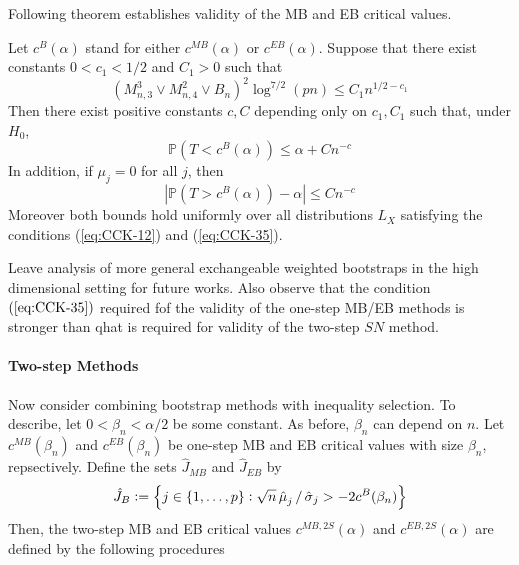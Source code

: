 Following theorem establishes validity of the MB and EB critical values. 
\vbox{ }
\begin{theorem}
	\label{thm:CCK-4.3}
	Let $c^B(\alpha)$ stand for either $c^{MB}(\alpha)$ or $c^{EB}(\alpha)$. Suppose that there exist constants $0 < c_1 < 1/2$ and $C_1 > 0$ such that 
	\begin{equation}
		\label{eq:CCK-35}
		(M_{n,3}^3 \vee M_{n,4}^2 \vee B_n)^2 \log^{7/2}(pn) \leq C_1 n^{1/2 - c_1}
	\end{equation}
	Then there exist positive constants $c, C$ depending only on $c_1, C_1$ such that, under $H_0$,
	\begin{equation}
		\label{eq:CCK-36}
		\mathbb{P}(T < c^B(\alpha))\leq \alpha + Cn^{-c}
	\end{equation}
	In addition, if $\mu_j = 0$ for all $j$, then 
	\begin{equation}
		\label{eq:CCK-37}
		\left|\mathbb{P}(T > c^B(\alpha)) - \alpha \right| \leq Cn^{-c}
	\end{equation}
	Moreover both bounds hold uniformly over all distributions $L_X$ satisfying the conditions (\ref{eq:CCK-12}) and (\ref{eq:CCK-35}).
\end{theorem}

Leave analysis of more general exchangeable weighted bootstraps in the high dimensional setting for future works. Also observe that the condition $(\ref{eq:CCK-35})$ required fof the validity of the one-step MB/EB methods is stronger than qhat is required for validity of the two-step $SN$ method.

\paragraph{Two-step Methods} 

Now consider combining bootstrap methods with inequality selection. To describe, let $0 < \beta_n < \alpha/2$ be some constant. As before, $\beta_n$ can depend on $n$. Let $c^{MB}(\beta_n)$ and $c^{EB}(\beta_n)$ be one-step MB and EB critical values with size $\beta_n$, repsectively. Define the sets $\hat{J}_{MB}$ and $\hat{J}_{EB}$ by 
\[\hat{J}_B := \left\{j \in \{1,\dots, p\}: \sqrt{n}\operatorname{\hat{\mu}}_j/\operatorname{\hat{\sigma}}_j > -2c^B(\beta_n)\right\}\]
Then, the two-step MB and EB critical values $c^{MB,2S}(\alpha)$ and $c^{EB, 2S}(\alpha)$ are defined by the following procedures

